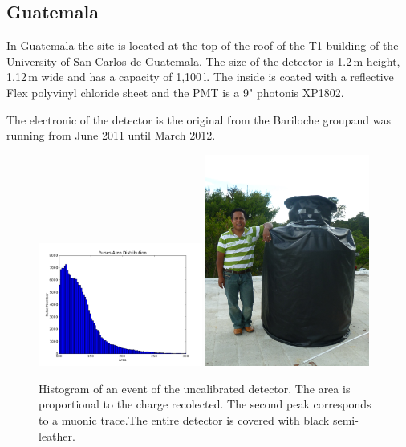 \subsection{Guatemala}\label{subsec:gua}

In Guatemala the site is located at the top of the roof of the T1 building of
the University of San Carlos de Guatemala. The size of the detector is 1.2\,m
height, 1.12\,m wide and has a capacity of 1,100\,l. The inside is coated
with a reflective Flex polyvinyl chloride sheet and the PMT is a 9" photonis
XP1802.

The electronic of the detector is the original from the Bariloche groupand was
running from June 2011 until March 2012.


\begin{figure}[h]
\begin{center}
\includegraphics[width=0.48\textwidth]{images/guatemala/Histo.png}
\includegraphics[width=0.48\textwidth]{images/guatemala/DimDet.jpg}
\caption{Histogram of an event of the uncalibrated detector. The area is proportional to the charge recolected. The second peak corresponds to a muonic trace.The entire detector is covered with black semi-leather.}
\label{fig:Histo-guate} 
\end{center}
\end{figure}
